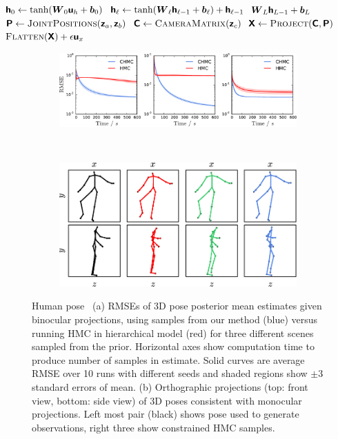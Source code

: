 \begin{algorithm}[t]
\begin{algorithmic}
  \State $\rvct{h}_0 \gets \tanh\lpa\mtx{W}_0 \rvct{u}_h + \vct{b}_0\rpa$
    \State $\rvct{h}_\ell \gets \tanh\lpa \mtx{W}_\ell \rvct{h}_{\ell -1} + \vct{b}_\ell \rpa + \rvct{h}_{\ell - 1}$
  \EndFor
  \State \Return $\boldsymbol{W}_{L}\boldsymbol{\mathsf{h}}_{L-1} + \boldsymbol{b}_L$
\EndFunction
{}
  \State $\rvct{P} \gets \Call{JointPositions}{\rvct{z}_a,\rvct{z}_b}$
  \State $\rvct{C} \gets \Call{CameraMatrix}{\rvct{z}_c}$
  \State $\rvct{X} \gets \Call{Project}{\rvct{C}, \rvct{P}}$
  \State \Return $\Call{Flatten}{\rvct{X}} + \epsilon\rvct{u}_x$
\EndFunction
\end{algorithmic}
\end{algorithm}

\begin{figure}[!t]
\centering
\begin{subfigure}[b]{0.9\textwidth}
  \includegraphics[width=\textwidth]{images/binocular-pose-estimates-rmse.pdf}
  \caption{}
  \label{sfig:pose-binocular-rmses}
\end{subfigure}
\\
\begin{subfigure}[b]{0.7\textwidth}
  \includegraphics[width=\textwidth]{images/monocular-pose-sample-projections.pdf}
  \caption{}
  \label{sfig:pose-monocular-samples}
\end{subfigure}
\caption[Inference in human pose model.]{\textsf{Human pose}~ (a) \acp{RMSE} of 3D pose posterior mean estimates given binocular projections, using samples from our method (blue) versus running \ac{HMC} in hierarchical model (red) for three different scenes sampled from the prior. Horizontal axes show computation time to produce number of samples in estimate. Solid curves are average \ac{RMSE} over 10 runs with different seeds and shaded regions show $\pm 3$ standard errors of mean. (b) Orthographic projections (top: front view, bottom: side view) of 3D poses consistent with monocular projections. Left most pair (black) shows pose used to generate observations, right three show constrained \ac{HMC} samples.}

\end{figure}

